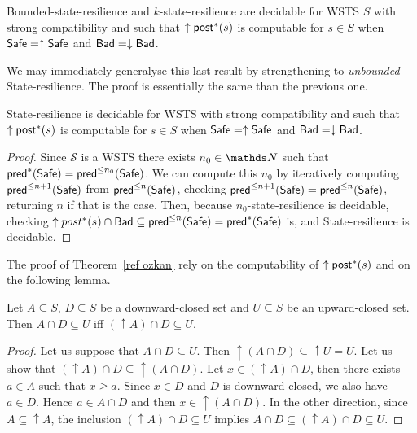 \begin{theorem}\cite{DBLP:conf/gg/Ozkan22,DBLP:journals/corr/abs-2108-00889}\label{ref ozkan}
{\sc Bounded-state-resilience} and {\sc $k$-state-resilience} are decidable for WSTS $S$ with strong compatibility and such that $\uparrow \textsf{post}^*(s)$ is computable for $s \in S$
when
$\textsf{Safe}=\uparrow \textsf{Safe}$
and $\textsf{Bad}=\downarrow \textsf{Bad}$.
\end{theorem}

We may immediately generalyse this last result by strengthening to \emph{unbounded} {\sc State-resilience}. The proof is essentially the same than the previous one.

\begin{corollary}\label{postcomputable}
{\sc State-resilience} is decidable for WSTS with strong compatibility and such that $\uparrow \textsf{post}^*(s)$ is computable for $s \in S$
when
$\textsf{Safe}=\uparrow \textsf{Safe}$
and $\textsf{Bad}=\downarrow \textsf{Bad}$.
\end{corollary}

\begin{proof}
Since $\mathscr{S}$ is a WSTS there exists $n_0 \in \N$ such that
$\textsf{pred}^*(\textsf{Safe}) =  \textsf{pred}^{\leq n_0}(\textsf{Safe})$. We can compute this $n_0$ by iteratively computing 
$\textsf{pred}^{\leq n+1}(\textsf{Safe})$ from $\textsf{pred}^{\leq n}(\textsf{Safe})$, checking 
$\textsf{pred}^{\leq n+1}(\textsf{Safe}) = \textsf{pred}^{\leq n}(\textsf{Safe})$, 
returning $n$ if that is the case.
Then, because {\sc $n_0$-state-resilience} is decidable, 
checking $\uparrow post^*(s) \cap \textsf{Bad} \subseteq \textsf{pred}^{\leq n}(\textsf{Safe}) = \textsf{pred}^*(\textsf{Safe})$ is,
and {\sc State-resilience} is decidable.
\end{proof}

The proof of Theorem~\ref{ref ozkan} rely on the computability of $\uparrow \textsf{post}^*(s)$ and on the following lemma.

\begin{lemma}\label{Lemma intersection}
Let $A \subseteq S$, $D \subseteq S$ be a downward-closed set and $U \subseteq S$ be an upward-closed set. 
Then $A \cap D \subseteq U$  iff $ (\uparrow  A) \cap D \subseteq U$.
\end{lemma}


\begin{proof}
Let us suppose that $A \cap D \subseteq U$. Then ${\uparrow (A \cap D)} \subseteq {\uparrow U} = U$.
Let us show that $({\uparrow A}) \cap D \subseteq {\uparrow (A \cap D)}$.
Let $x \in ({\uparrow A}) \cap D$, then there exists $a \in A$ such that $x \geq a$.
Since $x \in D$ and $D$ is downward-closed, we also have $a \in D$.
Hence $a \in A \cap D$ and then $x \in { \uparrow (A \cap D)}$.
In the other direction,
since $A \subseteq {\uparrow A}$, the inclusion
$({\uparrow  A}) \cap D \subseteq U$ implies
$A \cap D \subseteq ({\uparrow  A}) \cap D \subseteq U$.
\end{proof}

